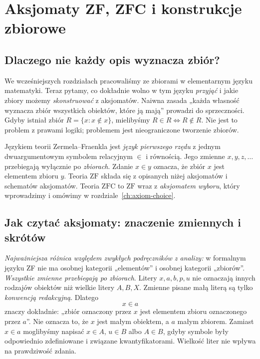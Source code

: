 \chapter{Aksjomaty ZF, ZFC i konstrukcje zbiorowe}\label{ch:zf-axioms}

\section{Dlaczego nie każdy opis wyznacza zbiór?}
We wcześniejszych rozdziałach pracowaliśmy ze zbiorami w elementarnym
języku matematyki. Teraz pytamy, co dokładnie wolno w tym języku
\emph{przyjąć} i jakie zbiory możemy \emph{skonstruować} z aksjomatów.
Naiwna zasada „każda własność wyznacza zbiór wszystkich obiektów,
które ją mają” prowadzi do sprzeczności. Gdyby istniał zbiór
$R=\{x:x\notin x\}$, mielibyśmy
$R\in R\iff R\notin R$. Nie jest to problem z prawami logiki;
problemem jest nieograniczone tworzenie zbiorów.

\begin{definicja}\label{def:zf-language}
Językiem teorii Zermela--Fraenkla jest \emph{język pierwszego rzędu}
z jednym dwuargumentowym symbolem relacyjnym $\in$ i równością.
Jego zmienne $x,y,z,\ldots$ przebiegają wyłącznie po \emph{zbiorach}.
Zdanie $x\in y$ oznacza, że zbiór $x$ jest elementem zbioru $y$.
Teoria $\mathrm{ZF}$ składa się z opisanych niżej aksjomatów
i schematów aksjomatów. Teoria $\mathrm{ZFC}$ to $\mathrm{ZF}$
wraz z \emph{aksjomatem wyboru}, który wprowadzimy i omówimy
w rozdziale~\ref{ch:axiom-choice}.
\end{definicja}


\section{Jak czytać aksjomaty: znaczenie zmiennych i skrótów}\label{sec:zf-reading-notation}

\emph{Najważniejsza różnica względem zwykłych podręczników z analizy:}
w formalnym języku ZF nie ma osobnej kategorii „elementów”
i osobnej kategorii „zbiorów”. \emph{Wszystkie zmienne przebiegają po zbiorach}.
Litery $x,a,b,p,u$ nie oznaczają innych rodzajów obiektów
niż wielkie litery $A,B,X$. Zmienne pisane małą literą
są tylko \emph{konwencją redakcyjną}. Dlatego
\[
             x\in a
\]
znaczy dokładnie: „zbiór oznaczony przez $x$ jest elementem
zbioru oznaczonego przez $a$”. Nie oznacza to, że
$x$ jest małym obiektem, a $a$ małym zbiorem.
Zamiast $x\in a$ moglibyśmy napisać $x\in A$,
$u\in B$ albo $A\in B$, gdyby symbole były odpowiednio
zdefiniowane i związane kwantyfikatorami. Wielkość liter
nie wpływa na prawdziwość zdania.

